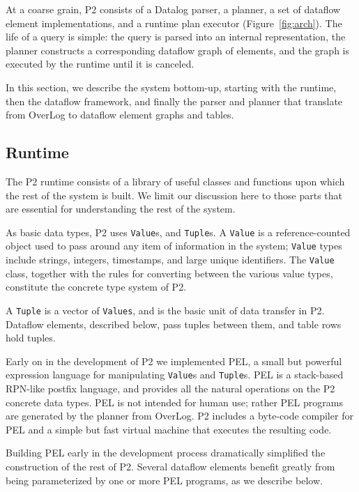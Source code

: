 \documentclass{sig-alt-full}
\def\Sys{P2\xspace}
\def\Lang{OverLog\xspace}
\def\ELang{PEL\xspace}
\def\Elang{\ELang}
\newcommand{\ol}[1]{{\tt\footnotesize#1}}
\begin{document}
At a coarse grain, \Sys consists of a Datalog parser, a planner, a
set of dataflow element implementations, and a runtime plan executor
(Figure~\ref{fig:arch}).  The life of a query is simple: the query is
parsed into an internal representation, the planner constructs a
corresponding dataflow graph of elements, and the graph is executed by
the runtime until it is canceled.

In this section, we describe the system bottom-up, starting with the
runtime, then the dataflow framework, and finally the parser and planner that
translate from
\Lang to dataflow element graphs and tables. 

\subsection{Runtime}

The \Sys runtime consists of a library of useful classes and functions upon
which the rest of the system is built.  We limit our discussion here
to those parts that are essential for understanding the rest of the
system. 

As basic data types, \Sys uses \ol{Value}s, and
\ol{Tuple}s.  A \ol{Value} is a reference-counted
object used to pass around any item of information in the system;
\ol{Value} types include strings, integers, timestamps, and large
unique identifiers.  
The \ol{Value} class, together with the rules for converting
between the various value types, constitute the concrete type system
of \Sys.  

A \ol{Tuple} is a vector of \ol{Values}, and is the
basic unit of data transfer in \Sys.  Dataflow elements, described
below, pass tuples between them, and table rows hold tuples. 

Early on in the development of \Sys we implemented \ELang, a small but
powerful expression language for manipulating \ol{Value}s and 
\ol{Tuple}s.  \Elang is a stack-based RPN-like postfix language,  and
provides all the natural operations on the \Sys concrete data types.
\Elang is not intended for human use; rather \Elang 
programs are generated by the planner from \Lang. 
\Sys includes a byte-code compiler for \Elang and a simple but fast
virtual machine that executes the resulting code.

Building \Elang early in the development process dramatically
simplified the construction of the rest of \Sys.  Several dataflow
elements benefit greatly from being parameterized by one or more
\Elang programs, as we describe below.
\end{document}
